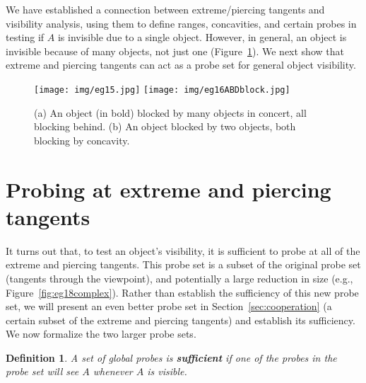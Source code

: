 \documentclass[10pt,twocolumn]{article}
\newtheorem{defn2}{Definition}
\begin{document}


We have established a connection between extreme/piercing tangents and visibility
analysis, using them to define ranges, concavities, and certain probes
in testing if $A$ is invisible due to a single object.
However, in general, an object is invisible because of many objects, not just one
(Figure~\ref{fig:blockconcert}).
We next show that extreme and piercing tangents can act as a probe set for 
general object visibility.

\begin{figure}[h]
\begin{center}
\texttt{[image: img/eg15.jpg]}
\texttt{[image: img/eg16ABDblock.jpg]}
\end{center}
\caption{(a) An object (in bold) blocked by many objects in concert, all blocking behind.
         (b) An object blocked by two objects, both blocking by concavity.}
\label{fig:blockconcert}
\end{figure}


\section{Probing at extreme and piercing tangents}
\label{sec:smallerprobeset}

It turns out that, to test an object's visibility,
it is sufficient to probe at all of the extreme and piercing tangents.
This probe set is a subset of the original probe set (tangents through the 
viewpoint), and potentially a large reduction in size 
(e.g., Figure~\ref{fig:eg18complex}).
Rather than establish the sufficiency of this new probe set, we will present 
an even better probe set in Section~\ref{sec:cooperation} 
(a certain subset of the extreme and piercing tangents) and establish its sufficiency.
We now formalize the two larger probe sets.

\begin{defn2}
A set of global probes is {\bf sufficient} if one of the probes in the probe set 
will see $A$ whenever $A$ is visible.
\end{defn2}
\end{document}
